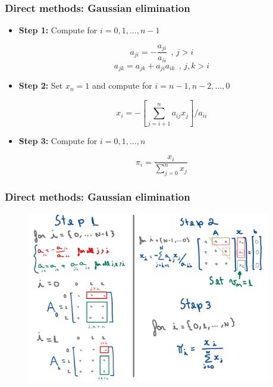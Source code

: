 \begin{frame}
    \frametitle{Direct methods: Gaussian elimination}

        \begin{itemize}
            \item \textbf{Step 1:} Compute for $i = 0,1,...,n-1$

            $$a_{ji} = -\frac{a_{ji}}{a_{ii}}~~\text{, $j>i$}$$
            $$a_{jk} = a_{jk}+a_{ji}a_{ik}~~\text{, $j,k>i$}$$

            \item \textbf{Step 2:} Set $x_{n} = 1$ and compute for $i = n-1, n-2,...,0$

            $$x_i = -\left[\sum_{j=i+1}^n a_{ij}x_{j}\right]/a_{ii}$$

            \item \textbf{Step 3:} Compute for $i = 0,1,...,n$

            $$\pi_i = \frac{x_i}{\sum_{j=0}^n x_j}$$

        \end{itemize}
\end{frame}

\begin{frame}
    \frametitle{Direct methods: Gaussian elimination}
    \begin{figure}
        \centering
        \includegraphics[width=0.95\textwidth]{slides/figures/gaussian_elimination_method.pdf}
    \end{figure}
\end{frame}

